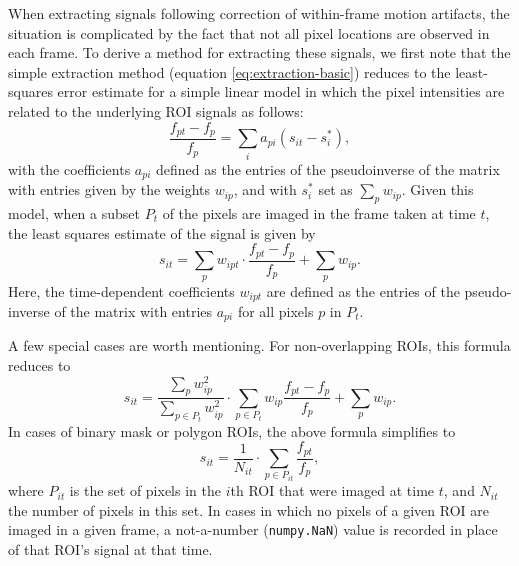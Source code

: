 When extracting signals following correction of within-frame motion artifacts,
the situation is complicated by the fact that not all pixel locations are observed
in each frame.
To derive a method for extracting these signals, we first note that the simple extraction method (equation \ref{eq:extraction-basic})
reduces to the least-squares error estimate for a simple linear model in which the 
pixel intensities are related to the underlying ROI signals as follows:
\begin{equation*}
    \frac{f_{pt}-f_p}{f_p} = \sum_i a_{pi} (s_{it} - s_i^*),
\end{equation*}
with the coefficients $a_{pi}$ defined as the entries of the pseudoinverse of the matrix with
entries given by the weights $w_{ip}$,
and with $s_i^*$ set as $\sum_p w_{ip}$.
Given this model, when a subset $P_t$ of the pixels are imaged in the frame taken at time $t$,
the least squares estimate of the signal is given by
\begin{equation*}
    s_{it} = \sum_{p} w_{ipt}\cdot \frac{f_{pt}-f_p}{f_p} + \sum_p w_{ip}.
\end{equation*}
Here, the time-dependent coefficients $w_{ipt}$ are defined as the entries of the pseudo-inverse
of the matrix with entries $a_{pi}$ for all pixels $p$ in $P_t$.

A few special cases are worth mentioning.
For non-overlapping ROIs, this formula reduces to
\begin{equation*}
    s_{it} = \frac{\sum_p w_{ip}^2}{\sum_{p\in P_t} w_{ip}^2}\cdot \sum_{p\in P_t} w_{ip}\frac{f_{pt}-f_p}{f_p} + \sum_p w_{ip}.
\end{equation*}
In cases of binary mask or polygon ROIs, the above formula simplifies to
\begin{equation*}
    s_{it} = \frac{1}{N_{it}}\cdot\sum_{p\in P_{it}}\frac{f_{pt}}{f_p},
\end{equation*}
where $P_{it}$ is the set of pixels in the $i$th ROI that were imaged at time $t$,
and $N_{it}$ the number of pixels in this set.
In cases in which no pixels of a given ROI are imaged in a given frame,
a not-a-number (\verb|numpy.NaN|) value is recorded in place of that ROI's signal at that time.




